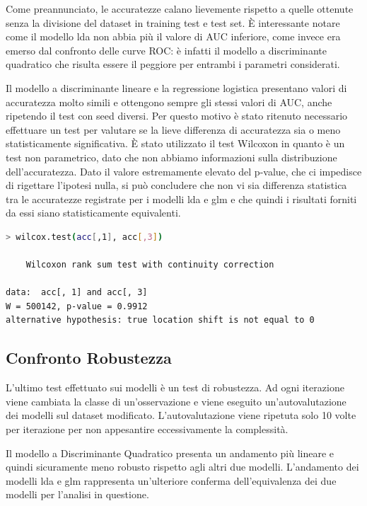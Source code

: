 \documentclass[11pt,a4paper]{article}
\begin{document}
Come preannunciato, le accuratezze calano lievemente rispetto a quelle ottenute senza la divisione del dataset in training test e test set.
È interessante notare come il modello lda non abbia più il valore di AUC inferiore, come invece era emerso dal confronto delle curve ROC: è infatti il modello a discriminante quadratico che risulta essere il peggiore per entrambi i parametri considerati. 

Il modello a discriminante lineare e la regressione logistica presentano valori di accuratezza molto simili e ottengono sempre gli stessi valori di AUC, anche ripetendo il test con seed diversi.
Per questo motivo è stato ritenuto necessario effettuare un test per valutare se la lieve differenza di accuratezza sia o meno statisticamente significativa. È stato utilizzato il test Wilcoxon in quanto è un test non parametrico, dato che non abbiamo informazioni sulla distribuzione dell'accuratezza. Dato il valore estremamente elevato del p-value, che ci impedisce di rigettare l'ipotesi nulla, si può concludere che non vi sia differenza statistica tra le accuratezze registrate per i modelli lda e glm e che quindi i risultati forniti da essi siano statisticamente equivalenti. 

\begin{lstlisting}[language=bash,basicstyle=\tiny,tabsize=2,frame = single]
> wilcox.test(acc[,1], acc[,3])

	Wilcoxon rank sum test with continuity correction

data:  acc[, 1] and acc[, 3]
W = 500142, p-value = 0.9912
alternative hypothesis: true location shift is not equal to 0

\end{lstlisting}

\subsection{Confronto Robustezza}
L'ultimo test effettuato sui modelli è un test di robustezza. Ad ogni iterazione viene cambiata la classe di un'osservazione e viene eseguito un'autovalutazione dei modelli sul dataset modificato.
L'autovalutazione viene ripetuta solo 10 volte per iterazione per non appesantire eccessivamente la complessità.

Il modello a Discriminante Quadratico presenta un andamento più lineare e quindi sicuramente meno robusto  rispetto agli altri due modelli.
L'andamento dei modelli lda e glm rappresenta un'ulteriore conferma dell'equivalenza dei due modelli per l'analisi in questione.
\end{document}
